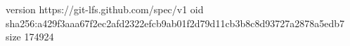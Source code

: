 version https://git-lfs.github.com/spec/v1
oid sha256:a429f3aaa67f2ec2afd2322efcb9ab01f2d79d11cb3b8c8d93727a2878a5edb7
size 174924
